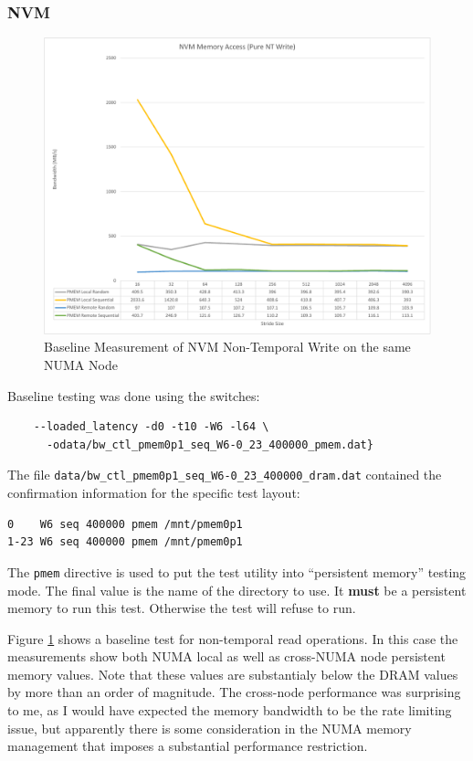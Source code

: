 \subsubsection{NVM}\label{baseline:nvm}

\begin{figure}[b]
\centering
    \caption{Baseline Measurement of NVM Non-Temporal Write on the same NUMA Node}\label{chart:baseline:nvm}
    \includegraphics[width=1\textwidth]{charts/nt-write-both-nodes-crop.pdf}
\end{figure}

Baseline testing was done using the switches:

\begin{verbatim}
    --loaded_latency -d0 -t10 -W6 -l64 \
      -odata/bw_ctl_pmem0p1_seq_W6-0_23_400000_pmem.dat}
\end{verbatim}

The file \verb+data/bw_ctl_pmem0p1_seq_W6-0_23_400000_dram.dat+ contained the confirmation information
for the specific test layout:

\begin{verbatim}
0    W6 seq 400000 pmem /mnt/pmem0p1
1-23 W6 seq 400000 pmem /mnt/pmem0p1
\end{verbatim}

The \verb+pmem+ directive is used to put the test utility into ``persistent memory'' testing mode.
The final value is the name of the directory to use.  It \textbf{must} be a persistent memory
to run this test.  Otherwise the test will refuse to run.

Figure \ref{chart:baseline:nvm} shows a baseline test for non-temporal
read operations.  In this case the measurements show both NUMA local
as well as cross-NUMA node persistent memory values.  Note that
these values are substantialy below the DRAM values by more than an
order of magnitude.  The cross-node performance was surprising to
me, as I would have expected the memory bandwidth to be the rate
limiting issue, but apparently there is some consideration in the NUMA
memory management that imposes a substantial performance restriction.

